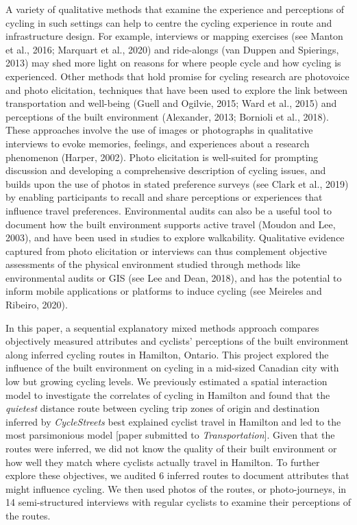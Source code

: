 \documentclass[]{elsarticle} %
\begin{document}
A variety of qualitative methods that examine the experience and
perceptions of cycling in such settings can help to centre the cycling
experience in route and infrastructure design. For example, interviews
or mapping exercises (see Manton et al., 2016; Marquart et al., 2020)
and ride-alongs (van Duppen and Spierings, 2013) may shed more light on
reasons for where people cycle and how cycling is experienced. Other
methods that hold promise for cycling research are photovoice and photo
elicitation, techniques that have been used to explore the link between
transportation and well-being (Guell and Ogilvie, 2015; Ward et al.,
2015) and perceptions of the built environment (Alexander, 2013;
Bornioli et al., 2018). These approaches involve the use of images or
photographs in qualitative interviews to evoke memories, feelings, and
experiences about a research phenomenon (Harper, 2002). Photo
elicitation is well-suited for prompting discussion and developing a
comprehensive description of cycling issues, and builds upon the use of
photos in stated preference surveys (see Clark et al., 2019) by enabling
participants to recall and share perceptions or experiences that
influence travel preferences. Environmental audits can also be a useful
tool to document how the built environment supports active travel
(Moudon and Lee, 2003), and have been used in studies to explore
walkability. Qualitative evidence captured from photo elicitation or
interviews can thus complement objective assessments of the physical
environment studied through methods like environmental audits or GIS
(see Lee and Dean, 2018), and has the potential to inform mobile
applications or platforms to induce cycling (see Meireles and Ribeiro,
2020).

In this paper, a sequential explanatory mixed methods approach compares
objectively measured attributes and cyclists' perceptions of the built
environment along inferred cycling routes in Hamilton, Ontario. This
project explored the influence of the built environment on cycling in a
mid-sized Canadian city with low but growing cycling levels. We
previously estimated a spatial interaction model to investigate the
correlates of cycling in Hamilton and found that the \emph{quietest}
distance route between cycling trip zones of origin and destination
inferred by \emph{CycleStreets} best explained cyclist travel in
Hamilton and led to the most parsimonious model {[}paper submitted to
\emph{Transportation}{]}. Given that the routes were inferred, we did
not know the quality of their built environment or how well they match
where cyclists actually travel in Hamilton. To further explore these
objectives, we audited 6 inferred routes to document attributes that
might influence cycling. We then used photos of the routes, or
photo-journeys, in 14 semi-structured interviews with regular cyclists
to examine their perceptions of the routes.
\end{document}
